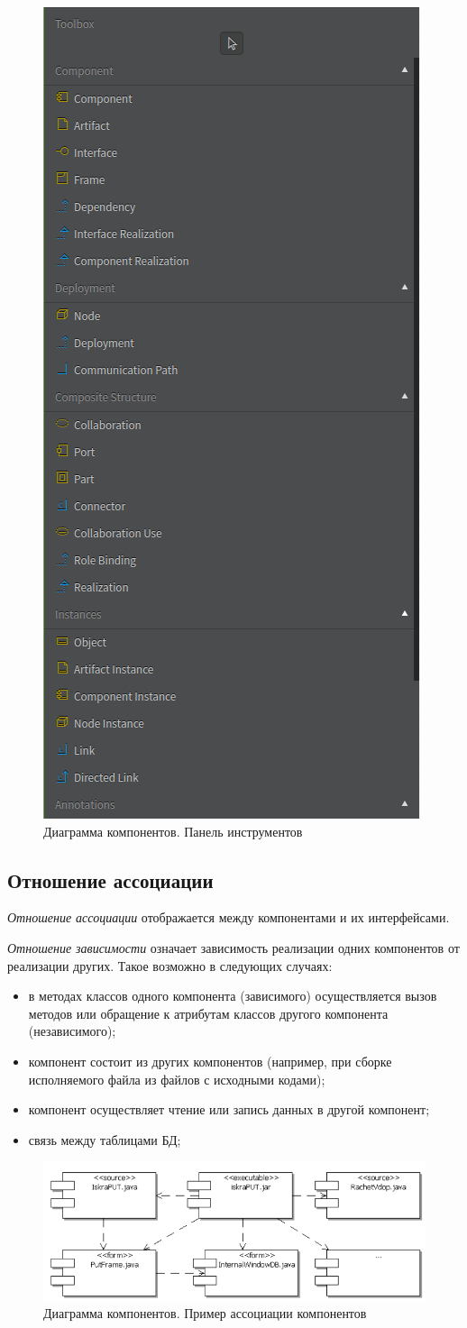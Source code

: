 \documentclass[a4paper,12pt]{report}
\begin{document}
\begin{figure}[h!]
	\centering
	\includegraphics[width=0.26\linewidth]{images/toolboxcomponents}
	\caption{Диаграмма компонентов. Панель инструментов}
	\label{fig:toolboxcomponents}
\end{figure}

\subsection*{Отношение ассоциации }
\textit{Отношение ассоциации} отображается между компонентами и их интерфейсами. 

\textit{Отношение зависимости} означает зависимость реализации одних компонентов от реализации других. Такое возможно в следующих случаях:
\begin{itemize}
	\item в методах классов одного компонента (зависимого) осуществляется вызов методов или обращение к атрибутам классов другого компонента (независимого);
	\item компонент состоит из других компонентов (например, при сборке исполняемого файла из файлов с исходными кодами);
	\item компонент осуществляет чтение или запись данных в другой компонент;
	\item связь между таблицами БД;
\end{itemize}

\begin{figure}
	\centering
	\includegraphics[width=0.5\linewidth]{images/componentsassociation}
	\caption{Диаграмма компонентов. Пример ассоциации компонентов}
	\label{fig:componentsassociation}
\end{figure}
\end{document}
